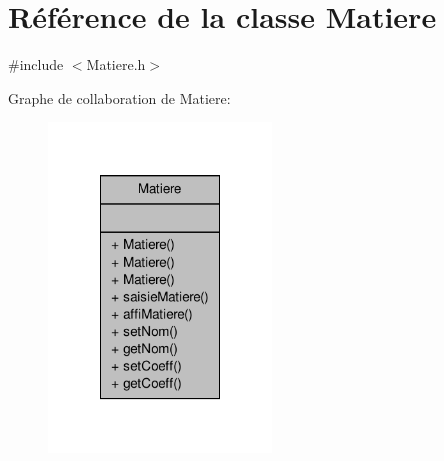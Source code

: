 \hypertarget{class_matiere}{\section{Référence de la classe Matiere}
\label{class_matiere}
}


{\ttfamily \#include $<$Matiere.\-h$>$}



Graphe de collaboration de Matiere\-:
\nopagebreak
\begin{figure}[H]
\begin{center}
\leavevmode
\includegraphics[width=168pt]{class_matiere__coll__graph}
\end{center}
\end{figure}
